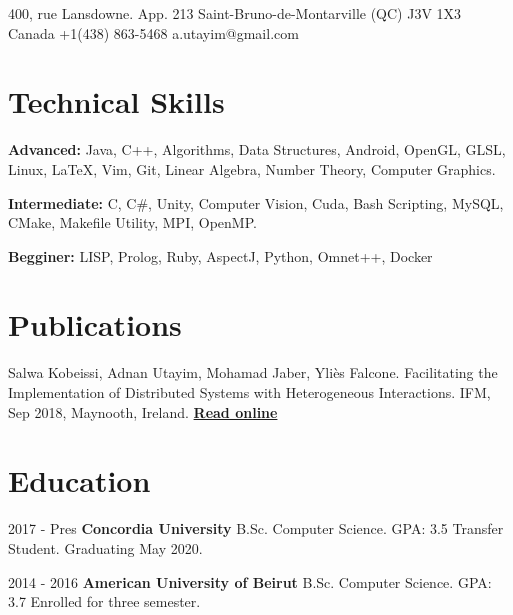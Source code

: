 \documentclass{tccv}
\begin{document}
\personal
    {400, rue Lansdowne. App. 213\hfill\break 
     Saint-Bruno-de-Montarville (QC) J3V 1X3\hfill\break
    Canada}
    {+1(438) 863-5468}
    {a.utayim@gmail.com}
    
    

\section{Technical Skills}

    {\textbf{Advanced:}
    Java, C++, Algorithms, Data Structures, Android, OpenGL, GLSL, Linux, \LaTeX, Vim, Git, Linear Algebra, Number Theory, Computer Graphics.
    \hfill\break


    \textbf{Intermediate:}
    C, C\#, Unity, Computer Vision,  Cuda, Bash Scripting, MySQL, CMake, Makefile Utility, MPI, OpenMP.
    \hfill\break

    \textbf{Begginer:}
    LISP, Prolog, Ruby, AspectJ, Python, Omnet++, Docker}

    
\section{\break Publications}
{Salwa Kobeissi, Adnan Utayim, Mohamad Jaber, Yliès Falcone.  Facilitating the Implementation of Distributed Systems with Heterogeneous Interactions. IFM, Sep 2018, Maynooth, Ireland. 
\href{https://link.springer.com/chapter/10.1007/978-3-319-98938-9_15?fbclid=IwAR3mB_0l1FImySHqTeFfwwBxNwwAB3lfXOTerruuuzMAQN9nHZKYdGKVSzk}{\textbf{Read online}}
}




\section{Education}
\begin{factlist}

\item{2017 - Pres}
    {\textbf{Concordia University}\hfill\break
      B.Sc. Computer Science. GPA: 3.5\hfill\break
      Transfer Student.\hfill\break 
      Graduating May 2020.
     }

\item{2014 - 2016}
    {\textbf{American University of Beirut}\hfill\break
     B.Sc. Computer Science. GPA: 3.7 \hfill\break
     Enrolled for three semester.}


\end{factlist}    
\end{document}

